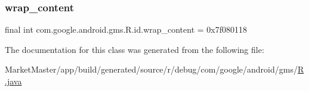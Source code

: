 \subsubsection{\texorpdfstring{wrap\+\_\+content}{wrap\_content}}
{\footnotesize\ttfamily final int com.\+google.\+android.\+gms.\+R.\+id.\+wrap\+\_\+content = 0x7f080118\hspace{0.3cm}{\ttfamily [static]}}



The documentation for this class was generated from the following file\+:\begin{DoxyCompactItemize}
\item 
Market\+Master/app/build/generated/source/r/debug/com/google/android/gms/\mbox{\hyperlink{debug_2com_2google_2android_2gms_2R_8java}{R.\+java}}\end{DoxyCompactItemize}

